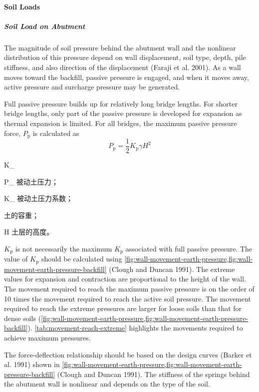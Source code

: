 \paragraph{Soil Loads}
\subparagraph{Soil Load on Abutment}
The magnitude of soil pressure behind the abutment wall and the nonlinear distribution of this pressure depend on wall displacement, soil type, depth, pile stiffness, and also direction of the displacement (Faraji et al. 2001). As a wall moves toward the backfill, passive pressure is engaged, and when it moves away, active pressure and surcharge pressure may be generated.

Full passive pressure builds up for relatively long bridge lengths. For shorter bridge lengths, only part of the passive pressure is developed for expansion as thermal expansion is limited. For all bridges, the maximum passive pressure force, $P_\text{p}$ is calculated as
\begin{equation}
  P_\text{p} = \frac{1}{2} K_\text{p} \gamma H^2
\end{equation}
\begin{EqDesc}{K_}
  \item[P_\text{p}] 被动土压力；
  \item[K_\text{p}] 被动土压力系数；
  \item[\gamma] 土的容重；
  \item[H] 土层的高度。
\end{EqDesc}

$K_\text{p}$ is not necessarily the maximum $K_\text{p}$ associated with full passive pressure. The value of $K_\text{p}$ should be calculated using \cref{fig:wall-movement-earth-pressure,fig:wall-movement-earth-pressure-backfill} (Clough and Duncan 1991). The extreme values for expansion and contraction are proportional to the height of the wall. The movement required to reach the maximum passive pressure is on the order of 10 times the movement required to reach the active soil pressure. The movement required to reach the extreme pressures are larger for loose soils than that for dense soils (\cref{fig:wall-movement-earth-pressure,fig:wall-movement-earth-pressure-backfill}). \cref{tab:movement-reach-extreme} highlights the movements required to achieve maximum pressures.

The force-deflection relationship should be based on the design curves (Barker et al. 1991) shown in \cref{fig:wall-movement-earth-pressure,fig:wall-movement-earth-pressure-backfill} (Clough and Duncan 1991). The stiffness of the springs behind the abutment wall is nonlinear and depends on the type of the soil.

